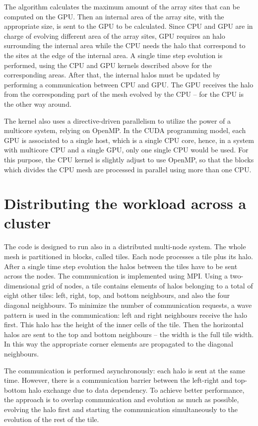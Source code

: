 The algorithm calculates the maximum amount of the array sites that can be computed on the GPU. Then an internal area of the array site, with the appropriate size, is sent to the GPU to be calculated. Since CPU and GPU are in charge of evolving different area of the array sites, GPU requires an halo surrounding the internal area while the CPU needs the halo that correspond to the sites at the edge of the internal area. A single time step evolution is performed, using the CPU and GPU kernels described above for the corresponding areas. After that, the internal halos must be updated by performing a communication between CPU and GPU. The GPU receives the halo from the corresponding part of the mesh evolved by the CPU -- for the CPU is the other way around. 

The kernel also uses a directive-driven parallelism to utilize the power of a multicore system, relying on OpenMP. In the CUDA programming model, each GPU is associated to a single host, which is a single CPU core, hence, in a system with multicore CPU and a single GPU, only one single CPU would be used. For this purpose, the CPU kernel is slightly adjust to use OpenMP, so that the blocks which divides the CPU mesh are processed in parallel using more than one CPU.

\section{Distributing the workload across a cluster}
The code is designed to run also in a distributed multi-node system. The whole mesh is partitioned in blocks, called tiles. Each node processes a tile plus its halo. After a single time step evolution the halos between the tiles have to be sent across the nodes. The communication is implemented using MPI. Using a two-dimensional grid of nodes, a tile contains elements of halos belonging to a total of eight other tiles: left, right, top, and bottom neighbours, and also the four diagonal neighbours. To minimize the number of communication requests, a wave pattern is used in the communication: left and right neighbours receive the halo first. This halo has the height of the inner cells of the tile. Then the horizontal halos are sent to the top and bottom neighbours – the width is the full tile width. In this way the appropriate corner elements are propagated to the diagonal neighbours.

The communication is performed asynchronously: each halo is sent at the same time. However, there is a communication barrier between the left-right and top-bottom halo exchange due to data dependency. To achieve better performance, the approach is to overlap communication and evolution as much as possible, evolving the halo first and starting the communication simultaneously to the evolution of the rest of the tile. 

